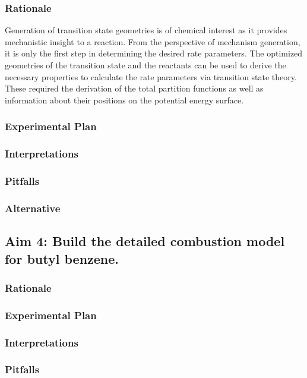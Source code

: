 \documentclass[12pt]{article}
\begin{document}
\subsubsection{Rationale}

Generation of transition state geometries is of chemical interest as it provides mechanistic insight to a reaction. From the perspective of mechanism generation, it is only the first step in determining the desired rate parameters. The optimized geometries of the transition state and the reactants can be used to derive the necessary properties to calculate the rate parameters via transition state theory. These required the derivation of the total partition functions as well as information about their positions on the potential energy surface.

\subsubsection{Experimental Plan}
\subsubsection{Interpretations}
\subsubsection{Pitfalls}
\subsubsection{Alternative}

\subsection{Aim 4: Build the detailed combustion model for butyl benzene.}



\subsubsection{Rationale}
\subsubsection{Experimental Plan}
\subsubsection{Interpretations}
\subsubsection{Pitfalls}
\end{document}
